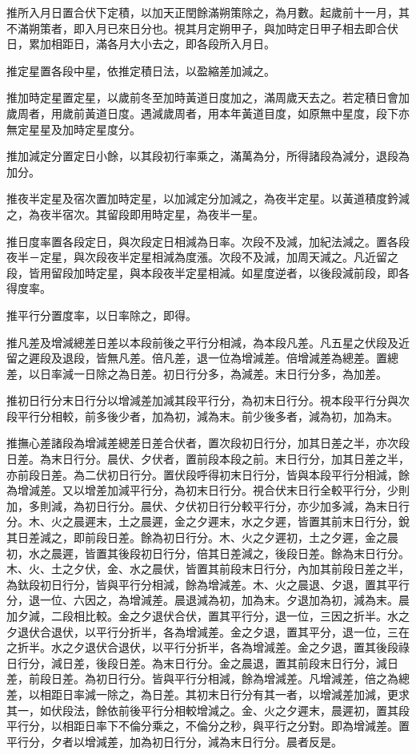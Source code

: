推所入月日置合伏下定積，以加天正閏餘滿朔策除之，為月數。起歲前十一月，其不滿朔策者，即入月已來日分也。視其月定朔甲子，與加時定日甲子相去即合伏日，累加相距日，滿各月大小去之，即各段所入月日。

推定星置各段中星，依推定積日法，以盈縮差加減之。

推加時定星置定星，以歲前冬至加時黃道日度加之，滿周歲天去之。若定積日會加歲周者，用歲前黃道日度。遇減歲周者，用本年黃道目度，如原無中星度，段下亦無定星星及加時定星度分。

推加減定分置定日小餘，以其段初行率乘之，滿萬為分，所得諸段為減分，退段為加分。

推夜半定星及宿次置加時定星，以加減定分加減之，為夜半定星。以黃道積度鈐減之，為夜半宿次。其留段即用時定星，為夜半一星。

推日度率置各段定日，與次段定日相減為日率。次段不及減，加紀法減之。置各段夜半－定星，與次段夜半定星相減為度漲。次段不及減，加周天減之。凡近留之段，皆用留段加時定星，與本段夜半定星相減。如星度逆者，以後段減前段，即各得度率。

推平行分置度率，以日率除之，即得。

推凡差及增減總差日差以本段前後之平行分相減，為本段凡差。凡五星之伏段及近留之遲段及退段，皆無凡差。倍凡差，退一位為增減差。倍增減差為總差。置總差，以日率減一日除之為日差。初日行分多，為減差。末日行分多，為加差。

推初日行分末日行分以增減差加減其段平行分，為初末日行分。視本段平行分與次段平行分相較，前多後少者，加為初，減為末。前少後多者，減為初，加為末。

推撫心差諸段為增減差總差日差合伏者，置次段初日行分，加其日差之半，亦次段日差。為末日行分。晨伏、夕伏者，置前段本段之前。末日行分，加其日差之半，亦前段日差。為二伏初日行分。置伏段呼得初末日行分，皆與本段平行分相減，餘為增減差。又以增差加減平行分，為初末日行分。視合伏末日行全較平行分，少則加，多則減，為初日行分。晨伏、夕伏初日行分較平行分，亦少加多減，為末日行分。木、火之晨遲末，土之晨遲，金之夕遲末，水之夕遲，皆置其前末日行分，銳其日差減之，即前段日差。餘為初日行分。木、火之夕遲初，土之夕遲，金之晨初，水之晨遲，皆置其後段初日行分，倍其日差減之，後段日差。餘為末日行分。木、火、土之夕伏，金、水之晨伏，皆置其前段末日行分，內加其前段日差之半，為鈦段初日行分，皆與平行分相減，餘為增減差。木、火之晨退、夕退，置其平行分，退一位、六因之，為增減差。晨退減為初，加為末。夕退加為初，減為末。晨加夕減，二段相比較。金之夕退伏合伏，置其平行分，退一位，三因之折半。水之夕退伏合退伏，以平行分折半，各為增減差。金之夕退，置其平分，退一位，三在之折半。水之夕退伏合退伏，以平行分折半，各為增減差。金之夕退，置其後段祿日行分，減日差，後段日差。為末日行分。金之晨退，置其前段末日行分，減日差，前段日差。為初日行分。皆與平行分相減，餘為增減差。凡增減差，倍之為總差，以相距日率減一除之，為日差。其初末日行分有其一者，以增減差加減，更求其一，如伏段法，餘依前後平行分相較增減之。金、火之夕遲末，晨遲初，置其段平行分，以相距日率下不倫分乘之，不倫分之秒，與平行之分對。即為增減差。置平行分，夕者以增減差，加為初日行分，減為末日行分。晨者反是。

